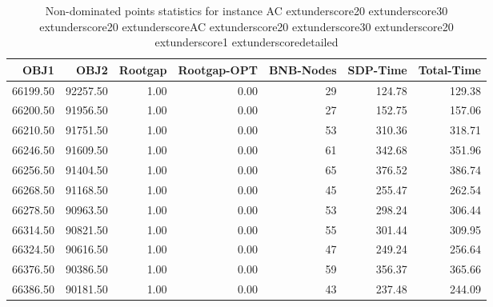 \begin{table}
\caption{Non-dominated points statistics for instance AC	extunderscore20	extunderscore30	extunderscore20	extunderscoreAC	extunderscore20	extunderscore30	extunderscore20	extunderscore1	extunderscoredetailed}
\label{tab:stats/AC_20_30_20_AC_20_30_20_1_detailed}
\begin{tabular}{rrrrrrr}
\toprule
OBJ1 & OBJ2 & Rootgap & Rootgap-OPT & BNB-Nodes & SDP-Time & Total-Time \\
\midrule
66199.50 & 92257.50 & 1.00 & 0.00 & 29 & 124.78 & 129.38 \\
66200.50 & 91956.50 & 1.00 & 0.00 & 27 & 152.75 & 157.06 \\
66210.50 & 91751.50 & 1.00 & 0.00 & 53 & 310.36 & 318.71 \\
66246.50 & 91609.50 & 1.00 & 0.00 & 61 & 342.68 & 351.96 \\
66256.50 & 91404.50 & 1.00 & 0.00 & 65 & 376.52 & 386.74 \\
66268.50 & 91168.50 & 1.00 & 0.00 & 45 & 255.47 & 262.54 \\
66278.50 & 90963.50 & 1.00 & 0.00 & 53 & 298.24 & 306.44 \\
66314.50 & 90821.50 & 1.00 & 0.00 & 55 & 301.44 & 309.95 \\
66324.50 & 90616.50 & 1.00 & 0.00 & 47 & 249.24 & 256.64 \\
66376.50 & 90386.50 & 1.00 & 0.00 & 59 & 356.37 & 365.66 \\
66386.50 & 90181.50 & 1.00 & 0.00 & 43 & 237.48 & 244.09 \\
\bottomrule
\end{tabular}
\end{table}
